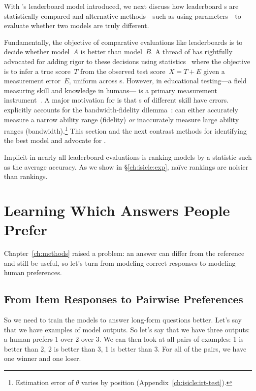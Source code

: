 With \name{}'s leaderboard \irt{} model introduced, we next discuss
how leaderboard \subj{}s are statistically compared and alternative
methods---such as using \irt{} parameters---to evaluate whether two
models are truly different.


Fundamentally, the objective of comparative evaluations like
leaderboards is to decide whether model~$A$ is better than model~$B$.
A thread of \nlp{} has rightfully advocated for adding rigor to these
decisions using statistics~\citep[Classical Testing
  Theory]{traub1997ctt} where the objective is to infer a true
score~$T$ from the observed test score~$X=T+E$ given a measurement
error~$E$, uniform across \subj{}s.
However, in educational testing---a field measuring skill and
knowledge in humans---\irt{} is a primary measurement
instrument~\citep[p.~2]{hambleton1991fundamentals}.
A major motivation for \irt{} is that \subj{}s of different skill have
 errors.
\irt{} explicitly accounts for the bandwidth-fidelity
dilemma~\citep{mcbride1976bandwidth}: \itms{} can either accurately
measure a narrow ability range (fidelity) \textit{or} inaccurately
measure large ability ranges (bandwidth).\footnote{Estimation error
  of $\theta$ varies by position (Appendix~\ref{ch:isicle:irt-test}).  }
This section and the next contrast methods for identifying the best
model and advocate for \irt{}.

\label{ch:isicle:agg}


Implicit in nearly all leaderboard evaluations is ranking models by a
statistic such as the average accuracy.
As we show in \S\ref{ch:isicle:exp}, na\"ive rankings are noisier than \irt{} rankings.


\section{Learning Which Answers People Prefer}
\label{sec:leaderboards:preferences}
\label{sec:methods:preferences}

Chapter~\ref{ch:methods} raised a problem: an answer can differ from the reference and still be useful, so let's turn from modeling correct responses to modeling human preferences.

\subsection{From Item Responses to Pairwise Preferences}

So we need to train the models to answer long-form questions better.  Let's say that we have examples of model outputs.  So let's say that we have three outputs: a human prefers 1 over 2 over 3.  We can then look at all pairs of examples: 1 is better than 2, 2 is better than 3, 1 is better than 3.  For all of the pairs, we have one winner and one loser.

